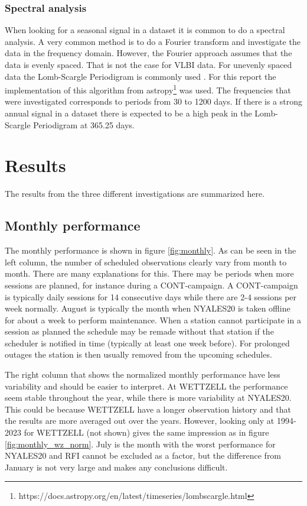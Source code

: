 \documentclass[twoside=semi,fontsize=12pt,paper=a4,titlepage=on]{kv_article}
\begin{document}
\subsubsection{Spectral analysis}
When looking for a seasonal signal in a dataset it is common to do a spectral analysis. A very common method is to do a Fourier transform and investigate the data in the frequency domain. However, the Fourier approach assumes that the data is evenly spaced. That is not the case for VLBI data. For unevenly spaced data the Lomb-Scargle Periodigram is commonly used \cite{vanderplas2018}. For this report the implementation of this algorithm from astropy\footnote{https://docs.astropy.org/en/latest/timeseries/lombscargle.html} was used. The frequencies that were investigated corresponds to periods from 30 to 1200 days. If there is a strong annual signal in a dataset there is expected to be a high peak in the Lomb-Scargle Periodigram at 365.25 days.

\section{Results}
The results from the three different investigations are summarized here. 

\subsection{Monthly performance}
The monthly performance is shown in figure \ref{fig:monthly}. As can be seen in the left column, the number of scheduled observations clearly vary from month to month. There are many explanations for this. There may be periods when more sessions are planned, for instance during a CONT-campaign. A CONT-campaign is typically daily sessions for 14 consecutive days while there are 2-4 sessions per week normally. August is typically the month when NYALES20 is taken offline for about a week to perform maintenance. When a station cannot participate in a session as planned the schedule may be remade without that station if the scheduler is notified in time (typically at least one week before). For prolonged outages the station is then usually removed from the upcoming schedules. 

The right column that shows the normalized monthly performance have less variability and should be easier to interpret. At WETTZELL the performance seem stable throughout the year, while there is more variability at NYALES20. This could be because WETTZELL have a longer observation history and that the results are more averaged out over the years. However, looking only at 1994-2023 for WETTZELL (not shown) gives the same impression as in figure \ref{fig:monthly_wz_norm}. July is the month with the worst performance for NYALES20 and RFI cannot be excluded as a factor, but the difference from January is not very large and makes any conclusions difficult.
\end{document}
